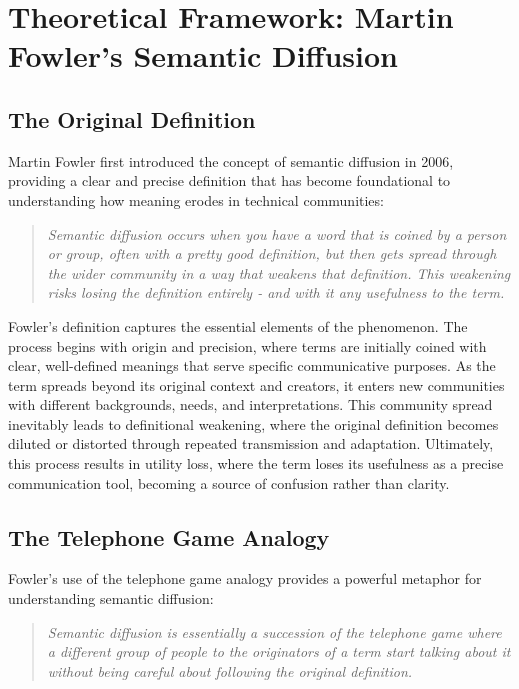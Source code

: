 \documentclass[11pt]{article}
\begin{document}
\section{Theoretical Framework: Martin Fowler's Semantic Diffusion}

\subsection{The Original Definition}

Martin Fowler first introduced the concept of semantic diffusion in 2006, providing a clear and precise definition that has become foundational to understanding how meaning erodes in technical communities:

\begin{quote}
\emph{Semantic diffusion occurs when you have a word that is coined by a person or group, often with a pretty good definition, but then gets spread through the wider community in a way that weakens that definition. This weakening risks losing the definition entirely - and with it any usefulness to the term.}
\end{quote}

Fowler's definition captures the essential elements of the phenomenon. The process begins with origin and precision, where terms are initially coined with clear, well-defined meanings that serve specific communicative purposes. As the term spreads beyond its original context and creators, it enters new communities with different backgrounds, needs, and interpretations. This community spread inevitably leads to definitional weakening, where the original definition becomes diluted or distorted through repeated transmission and adaptation. Ultimately, this process results in utility loss, where the term loses its usefulness as a precise communication tool, becoming a source of confusion rather than clarity.

\subsection{The Telephone Game Analogy}

Fowler's use of the telephone game analogy provides a powerful metaphor for understanding semantic diffusion:

\begin{quote}
\emph{Semantic diffusion is essentially a succession of the telephone game where a different group of people to the originators of a term start talking about it without being careful about following the original definition.}
\end{quote}
\end{document}
